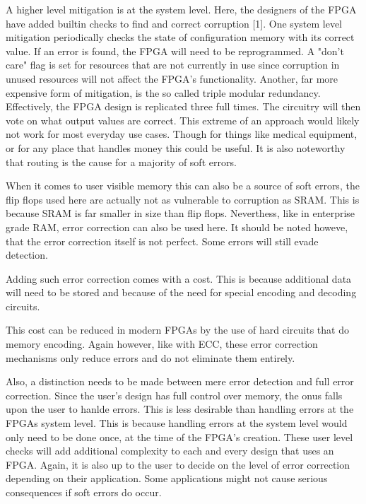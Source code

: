 \documentclass{article}
\begin{document}
    A higher level mitigation is at the system level. Here, the designers of the FPGA have added builtin checks
    to find and correct corruption [1].
    One system level mitigation periodically checks the state of configuration memory
    with its correct value. If an error is found, the FPGA will need to be reprogrammed.
    A "don't care" flag is set for resources that are not currently in use since
    corruption in unused resources will not affect the FPGA's functionality.
    Another, far more expensive form of mitigation, is the so called triple modular
    redundancy. Effectively, the FPGA design is replicated three full times.
    The circuitry will then vote on what output values are correct.
    This extreme of an approach would likely not work for most everyday use cases.
    Though for things like medical equipment, or for any place that handles money this
    could be useful.
    It is also noteworthy that routing is the cause for a majority of soft errors.

    When it comes to user visible memory this can also be a source of soft errors,
    the flip flops used here are actually not as vulnerable to corruption as SRAM.
    This is because SRAM is far smaller in size than flip flops. Neverthess,
    like in enterprise grade RAM, error correction can also be used here.
    It should be noted howeve, that the error correction itself is not perfect. Some
    errors will still evade detection.

    Adding such error correction comes with a cost. This is because additional data will
    need to be stored and because of the need for special encoding and decoding circuits.

    This cost can be reduced in modern FPGAs by the use of hard circuits that
    do memory encoding. Again however, like with ECC, these error correction mechanisms
    only reduce errors and do not eliminate them entirely.

    Also, a distinction needs to be made between mere error detection and full error correction.
    Since the user's design has full control over memory, the onus falls upon the user
    to hanlde errors. This is less desirable than handling errors at the FPGAs system level.
    This is because handling errors at the system level would only need to be done once,
    at the time of the FPGA's creation. These user level checks will add additional complexity
    to each and every design that uses an FPGA.
    Again, it is also up to the user to decide on the level of error correction depending
    on their application. Some applications might not cause serious consequences if
    soft errors do occur.
\end{document}
